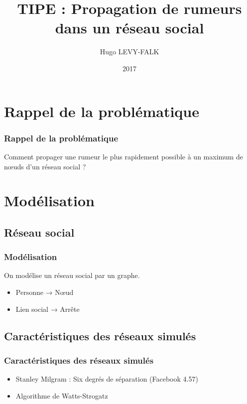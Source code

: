 \documentclass{beamer}
\title[Propagation de rumeurs dans un réseau social]{TIPE : Propagation de rumeurs dans un réseau social}
\author{Hugo LEVY-FALK}
\date{ 2017 }
\begin{document}
\begin{frame}
  \titlepage
\end{frame}

\section{Rappel de la problématique}
\begin{frame}
  \frametitle{Rappel de la problématique}
  \begin{center}
  Comment propager une rumeur le plus rapidement possible à un maximum de nœuds d'un réseau social ?
  \end{center}
\end{frame}

\section{Modélisation}
\subsection{Réseau social}
\begin{frame}
  \frametitle{Modélisation}
  On modélise un réseau social par un graphe.
  \begin{itemize}
    \item<2-> Personne → Nœud
    \item<3-> Lien social → Arrête
  \end{itemize}
\end{frame}
\subsection{Caractéristiques des réseaux simulés}
\begin{frame}
  \frametitle{Caractéristiques des réseaux simulés}
  \begin{itemize}
    \item<2-> Stanley Milgram : Six degrés de séparation (Facebook 4.57)
    \item<3-> Algorithme de Watts-Strogatz
  \end{itemize}
\end{frame}
\end{document}
